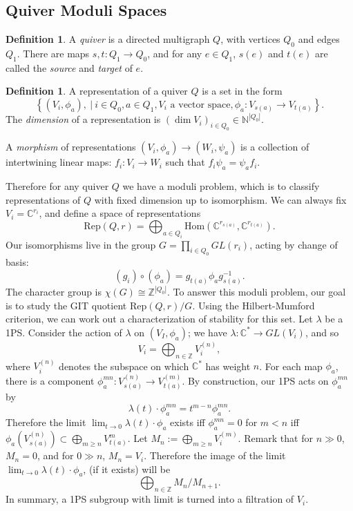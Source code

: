 \documentclass{article}
\theoremstyle{definition}
\newtheorem{definition}[theorem]{Definition}
\theoremstyle{remark}
\numberwithin{theorem}{section}
\newcommand{\C}{\mathbb{C}}
\newcommand{\Rep}{\mathrm{Rep}}
\newcommand{\Hom}{\text{Hom}}
\newenvironment{defn}{
	\begin{mdframed}
		\vspace{-0.5em}
		\begin{definition}
		}{
		\end{definition}
	\end{mdframed}
}
\begin{document}
			\subsection{Quiver Moduli Spaces}
			\begin{defn}
				A \emph{quiver} is a directed multigraph $Q$, with vertices $Q_0$ and edges $Q_1$. There are maps $s,t:Q_1\to Q_0$, and for any $e\in Q_1$, $s(e)$ and $t(e)$ are called the \emph{source} and \emph{target} of $e$.
			\end{defn}
			\begin{defn}
				A representation of a quiver $Q$ is a set in the form$$\left\{
				(V_i, \phi_a), ~|~ i\in Q_0, a\in  Q_1, V_i \text{ a vector space}, \phi_a:V_{s(a)}\to V_{t(a)}
				\right\}.$$
				The \emph{dimension} of a representation is $(\dim V_i)_{i \in Q_0} \in \mathbb{N}^{|Q_0|}$. \vspace{1em}
				
				A \emph{morphism} of representations $(V_i,\phi_a)\to(W_i,\psi_a)$ is a collection of intertwining linear maps: $f_i:V_i\to W_i$ such that $f_i\psi_a = \psi_af_i$.
			\end{defn}
			Therefore for any quiver $Q$ we have a moduli problem, which is to classify representations of $Q$ with fixed dimension up to isomorphism. We can always fix $V_i = \C^{r_i}$, and define a space of representations
			\begin{equation}
			\Rep(Q,r) = \bigoplus_{a\in Q_i}\Hom(\mathbb{C}^{r_{s(a)}}, \C^{r_{t(a)}}).
			\end{equation}
			Our isomorphisms live in the group $G = \prod_{i \in Q_0} GL(r_i)$, acting by change of basis: 
			$$(g_i)\circ (\phi_a) = g_{t(a)} \phi_a g_{s(a)}^{-1}.$$
			The character group is $\chi(G) \cong \mathbb{Z}^{|Q_0|}$. To answer this moduli problem, our goal is to study the GIT quotient $\Rep(Q,r)/G$. Using the Hilbert-Mumford criterion, we can work out a characterization of stability for this set. Let $\lambda$ be a 1PS. Consider the action of $\lambda$ on $(V_I,\phi_a)$; we have $\lambda:\C^\ast \to GL(V_i)$, and so $$V_i = \bigoplus_{n\in\mathbb{Z}} V_i^{(n)},$$	where $V_i^{(n)}$ denotes the subspace on which $\C^\ast$ has weight $n$. For each map $\phi_a$, there is a component $\phi_a^{mn}:V_{s(a)}^{(n)}\to V_{t(a)}^{(m)}$. By construction, our 1PS acts on $\phi_a^{mn}$ by
			$$\lambda(t)\cdot \phi_a^{mn} = t^{m-n}\phi_a^{mn}.$$
			Therefore the limit $\lim_{t\to 0} \lambda(t)\cdot \phi_a$ exists iff $\phi_a^{mn}=0$ for $m<n$ iff $\phi_a(V_{s(a)}^{(n)}) \subset \bigoplus_{m\geq n} V_{t(a)}^m$. Let $M_n := \bigoplus_{m\geq n} V_i^{(m)}$. Remark that for $n\gg 0$, $M_n=0$, and for $0\gg n$, $M_n = V_i$. Therefore the image of the limit $\lim_{t\to 0} \lambda(t)\cdot \phi_a$, (if it exists) will be 
			$$\bigoplus_{n\in \mathbb{Z}} M_n/M_{n+1}.$$
			In summary, a 1PS subgroup with limit is turned into a filtration of $V_i$. \vspace{1em}
			
\end{document}
